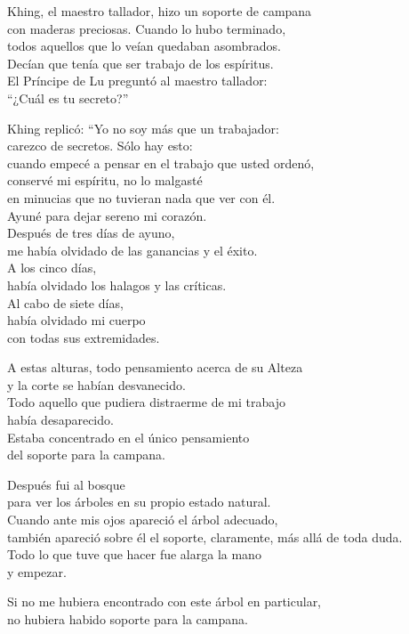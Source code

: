 \documentclass[book,b5paper,hidelinks,final]{memoir}
\begin{document}
	Khing, el maestro tallador, hizo un soporte de campana\\
	con maderas preciosas. Cuando lo hubo terminado,\\
	todos aquellos que lo veían quedaban asombrados.\\
	Decían que tenía que ser trabajo de los espíritus.\\
	El Príncipe de Lu preguntó al maestro tallador:\\
	``¿Cuál es tu secreto?''
	
	Khing replicó: ``Yo no soy más que un trabajador:\\
	carezco de secretos. Sólo hay esto:\\
	cuando empecé a pensar en el trabajo que usted ordenó,\\
	conservé mi espíritu, no lo malgasté\\
	en minucias que no tuvieran nada que ver con él.\\
	Ayuné para dejar sereno mi corazón.\\
	Después de tres días de ayuno,\\
	me había olvidado de las ganancias y el éxito.\\
	A los cinco días,\\
	había olvidado los halagos y las críticas.\\
	Al cabo de siete días,\\
	había olvidado mi cuerpo\\
	con todas sus extremidades.
	
	A estas alturas, todo pensamiento acerca de su Alteza\\
	y la corte se habían desvanecido.\\
	Todo aquello que pudiera distraerme de mi trabajo\\
	había desaparecido.\\
	Estaba concentrado en el único pensamiento\\
	del soporte para la campana.
	
	Después fui al bosque\\
	para ver los árboles en su propio estado natural.\\
	Cuando ante mis ojos apareció el árbol adecuado,\\
	también apareció sobre él el soporte, claramente, más allá de toda
	duda.\\
	Todo lo que tuve que hacer fue alarga la mano\\
	y empezar.
	
	Si no me hubiera encontrado con este árbol en particular,\\
	no hubiera habido soporte para la campana.
	
\end{document}
